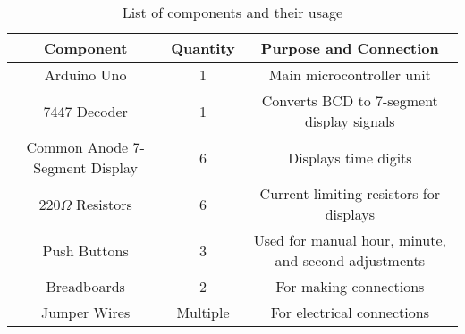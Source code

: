 \begin{table}[h]
    \centering
    \begin{tabular}{|c|c|c|}
        \hline
        \textbf{Component} & \textbf{Quantity} & \textbf{Purpose and Connection} \\
        \hline
        Arduino Uno & 1 & Main microcontroller unit \\
        7447 Decoder & 1 & Converts BCD to 7-segment display signals \\
        Common Anode 7-Segment Display & 6 & Displays time digits \\
        220$\Omega$ Resistors & 6 & Current limiting resistors for displays \\
        Push Buttons & 3 & Used for manual hour, minute, and second adjustments \\
        Breadboards & 2 & For making connections \\
        Jumper Wires & Multiple & For electrical connections \\
        \hline
    \end{tabular}
    \caption{List of components and their usage}
    \label{tab:components}
\end{table}